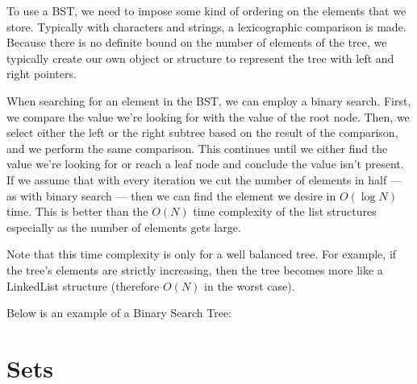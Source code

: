 To use a BST, we need to impose some kind of ordering on the elements that we store. Typically with characters and strings, a lexicographic comparison is made. Because there is no definite bound on the number of elements of the tree, we typically create our own object or structure to represent the tree with left and right pointers.

When searching for an element in the BST, we can employ a binary search. First, we compare the value we're looking for with the value of the root node. Then, we select either the left or the right subtree based on the result of the comparison, and we perform the same comparison. This continues until we either find the value we're looking for or reach a leaf node and conclude the value isn't present. If we assume that with every iteration we cut the number of elements in half --- as with binary search --- then we can find the element we desire in $O(\log{N})$ time. This is better than the $O(N)$ time complexity of the list structures especially as the number of elements gets large.

Note that this time complexity is only for a well balanced tree. For example, if the tree's elements are strictly increasing, then the tree becomes more like a LinkedList structure (therefore $O(N)$ in the worst case).


Below is an example of a Binary Search Tree:
\begin{center}
\end{center}


\section{Sets}

